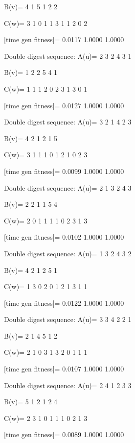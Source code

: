 B(v)=
     4     1     5     1     2     2

C(w)=
     3     1     0     1     1     3     1     1     2     0     2

[time gen fitness]=
    0.0117    1.0000    1.0000

Double digest sequence:
A(u)=
     2     3     2     4     3     1

B(v)=
     1     2     2     5     4     1

C(w)=
     1     1     1     2     0     2     3     1     3     0     1

[time gen fitness]=
    0.0127    1.0000    1.0000

Double digest sequence:
A(u)=
     3     2     1     4     2     3

B(v)=
     4     2     1     2     1     5

C(w)=
     3     1     1     1     0     1     2     1     0     2     3

[time gen fitness]=
    0.0099    1.0000    1.0000

Double digest sequence:
A(u)=
     2     1     3     2     4     3

B(v)=
     2     2     1     1     5     4

C(w)=
     2     0     1     1     1     1     0     2     3     1     3

[time gen fitness]=
    0.0102    1.0000    1.0000

Double digest sequence:
A(u)=
     1     3     2     4     3     2

B(v)=
     4     2     1     2     5     1

C(w)=
     1     3     0     2     0     1     2     1     3     1     1

[time gen fitness]=
    0.0122    1.0000    1.0000

Double digest sequence:
A(u)=
     3     3     4     2     2     1

B(v)=
     2     1     4     5     1     2

C(w)=
     2     1     0     3     1     3     2     0     1     1     1

[time gen fitness]=
    0.0107    1.0000    1.0000

Double digest sequence:
A(u)=
     2     4     1     2     3     3

B(v)=
     5     1     2     1     2     4

C(w)=
     2     3     1     0     1     1     1     0     2     1     3

[time gen fitness]=
    0.0089    1.0000    1.0000

